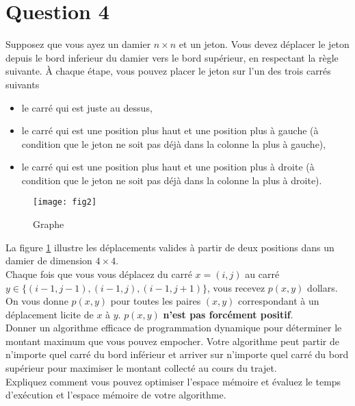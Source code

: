 \documentclass[devoir3.tex]{subfiles}
\begin{document}
\section*{Question 4}
Supposez que vous ayez un damier \(n \times n\) et un jeton. Vous devez déplacer
le jeton depuis le bord inferieur du damier vers le bord supérieur, en respectant la règle suivante. À chaque étape, vous pouvez placer le jeton sur l’un des trois carrés suivants

\begin{itemize}
	\item le carré qui est juste au dessus,
	\item le carré qui est une position plus haut et une position plus à gauche (à condition que le jeton ne soit pas déjà dans la colonne la plus à gauche),
	\item le carré qui est une position plus haut et une position plus à droite (à condition que le jeton ne soit pas déjà dans la colonne la plus à droite).
\end{itemize}

\begin{figure}[H]
	\centering
	\texttt{[image: fig2]}
	\caption{Graphe}
	\label{fig:fig2}
\end{figure}

La figure \ref{fig:fig2} illustre les déplacements valides à partir de deux positions dans un damier de dimension \(4 \times 4\). \\

Chaque fois que vous vous déplacez du carré \(x = (i, j)\) au carré \(y \in \lbrace (i-1,j-1),(i-1,j),(i-1,j+1) \rbrace \), vous recevez \(p(x, y)\) dollars. On vous donne \(p(x, y)\) pour toutes les paires \((x, y)\) correspondant à un déplacement licite de \(x\) à \(y\). \(p(x, y)\) \textbf{n’est pas forcément positif}. \\

Donner un algorithme efficace de programmation dynamique pour déterminer le montant maximum que vous pouvez empocher. Votre algorithme peut partir de n’importe quel carré du bord inférieur et arriver sur n’importe quel carré du bord supérieur pour maximiser le montant collecté au cours du trajet. \\

Expliquez comment vous pouvez optimiser l’espace mémoire et évaluez le temps d’exécution et l’espace mémoire de votre algorithme. \\

\newpage
\end{document}
